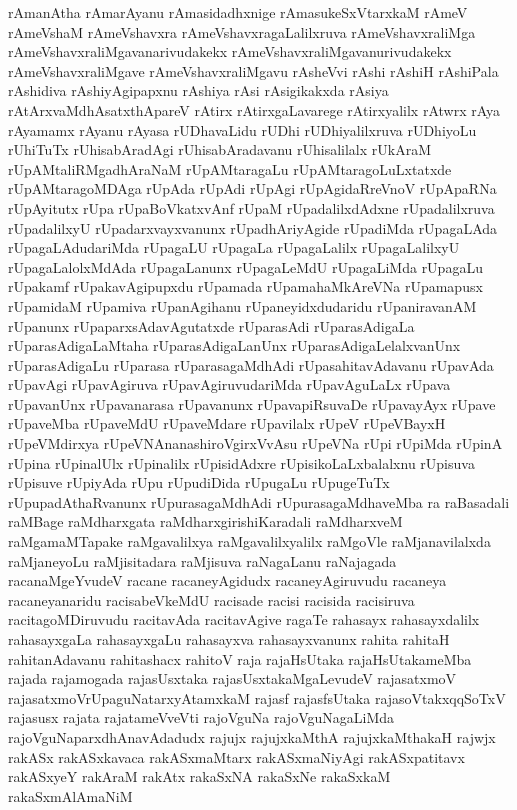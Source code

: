 {rAmanAtha
rAmarAyanu
rAmasidadhxnige
rAmasukeSxVtarxkaM
rAmeV
rAmeVshaM
rAmeVshavxra
rAmeVshavxragaLalilxruva
rAmeVshavxraliMga
rAmeVshavxraliMgavanarivudakekx
rAmeVshavxraliMgavanurivudakekx
rAmeVshavxraliMgave
rAmeVshavxraliMgavu
rAsheVvi
rAshi
rAshiH
rAshiPala
rAshidiva
rAshiyAgipapxnu
rAshiya
rAsi
rAsigikakxda
rAsiya
rAtArxvaMdhAsatxthApareV
rAtirx
rAtirxgaLavarege
rAtirxyalilx
rAtwrx
rAya
rAyamamx
rAyanu
rAyasa
rUDhavaLidu
rUDhi
rUDhiyalilxruva
rUDhiyoLu
rUhiTuTx
rUhisabAradAgi
rUhisabAradavanu
rUhisalilalx
rUkAraM
rUpAMtaliRMgadhAraNaM
rUpAMtaragaLu
rUpAMtaragoLuLxtatxde
rUpAMtaragoMDAga
rUpAda
rUpAdi
rUpAgi
rUpAgidaRreVnoV
rUpApaRNa
rUpAyitutx
rUpa
rUpaBoVkatxvAnf
rUpaM
rUpadalilxdAdxne
rUpadalilxruva
rUpadalilxyU
rUpadarxvayxvanunx
rUpadhAriyAgide
rUpadiMda
rUpagaLAda
rUpagaLAdudariMda
rUpagaLU
rUpagaLa
rUpagaLalilx
rUpagaLalilxyU
rUpagaLalolxMdAda
rUpagaLanunx
rUpagaLeMdU
rUpagaLiMda
rUpagaLu
rUpakamf
rUpakavAgipupxdu
rUpamada
rUpamahaMkAreVNa
rUpamapusx
rUpamidaM
rUpamiva
rUpanAgihanu
rUpaneyidxdudaridu
rUpaniravanAM
rUpanunx
rUpaparxsAdavAgutatxde
rUparasAdi
rUparasAdigaLa
rUparasAdigaLaMtaha
rUparasAdigaLanUnx
rUparasAdigaLelalxvanUnx
rUparasAdigaLu
rUparasa
rUparasagaMdhAdi
rUpasahitavAdavanu
rUpavAda
rUpavAgi
rUpavAgiruva
rUpavAgiruvudariMda
rUpavAguLaLx
rUpava
rUpavanUnx
rUpavanarasa
rUpavanunx
rUpavapiRsuvaDe
rUpavayAyx
rUpave
rUpaveMba
rUpaveMdU
rUpaveMdare
rUpavilalx
rUpeV
rUpeVBayxH
rUpeVMdirxya
rUpeVNAnanashiroVgirxVvAsu
rUpeVNa
rUpi
rUpiMda
rUpinA
rUpina
rUpinalUlx
rUpinalilx
rUpisidAdxre
rUpisikoLaLxbalalxnu
rUpisuva
rUpisuve
rUpiyAda
rUpu
rUpudiDida
rUpugaLu
rUpugeTuTx
rUpupadAthaRvanunx
rUpurasagaMdhAdi
rUpurasagaMdhaveMba
ra
raBasadali
raMBage
raMdharxgata
raMdharxgirishiKaradali
raMdharxveM
raMgamaMTapake
raMgavalilxya
raMgavalilxyalilx
raMgoVle
raMjanavilalxda
raMjaneyoLu
raMjisitadara
raMjisuva
raNagaLanu
raNajagada
racanaMgeYvudeV
racane
racaneyAgidudx
racaneyAgiruvudu
racaneya
racaneyanaridu
racisabeVkeMdU
racisade
racisi
racisida
racisiruva
racitagoMDiruvudu
racitavAda
racitavAgive
ragaTe
rahasayx
rahasayxdalilx
rahasayxgaLa
rahasayxgaLu
rahasayxva
rahasayxvanunx
rahita
rahitaH
rahitanAdavanu
rahitashacx
rahitoV
raja
rajaHsUtaka
rajaHsUtakameMba
rajada
rajamogada
rajasUsxtaka
rajasUsxtakaMgaLevudeV
rajasatxmoV
rajasatxmoVrUpaguNatarxyAtamxkaM
rajasf
rajasfsUtaka
rajasoVtakxqqSoTxV
rajasusx
rajata
rajatameVveVti
rajoVguNa
rajoVguNagaLiMda
rajoVguNaparxdhAnavAdadudx
rajujx
rajujxkaMthA
rajujxkaMthakaH
rajwjx
rakASx
rakASxkavaca
rakASxmaMtarx
rakASxmaNiyAgi
rakASxpatitavx
rakASxyeY
rakAraM
rakAtx
rakaSxNA
rakaSxNe
rakaSxkaM
rakaSxmAlAmaNiM
}
